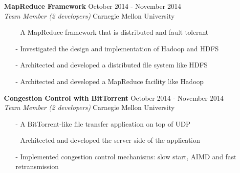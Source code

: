 \documentclass[mm, 7pt]{resume} %
\begin{document}
\begin{resume}
\textbf{MapReduce Framework}  \hfill  October 2014 - November 2014 \\
{\sl Team Member (2 developers)}   \hfill  Carnegie Mellon University
\begin{itemize} \itemsep -2pt
\item[-] A MapReduce framework that is distributed and fault-tolerant
\item[-] Investigated the design and implementation of Hadoop and HDFS
\item[-] Architected and developed a distributed file system like HDFS
\item[-] Architected and developed a MapReduce facility like Hadoop
\end{itemize}

\textbf{Congestion Control with BitTorrent} \hfill October 2014 - November 2014 \\
{\sl Team Member (2 developers)} \hfill Carnegie Mellon University
\begin{itemize} \itemsep -2pt
\item[-] A BitTorrent-like file transfer application on top of UDP
\item[-] Architected and developed the server-side of the application
\item[-] Implemented congestion control mechanisms: slow start, AIMD and fast retransmission
\end{itemize}

 
%


\end{resume}
\end{document}
